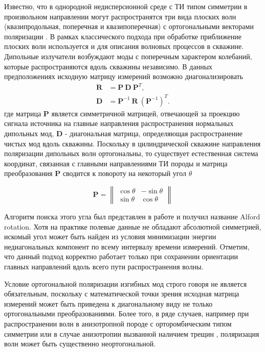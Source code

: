 \documentclass[a4paper,11pt]{article}
\begin{document}
Известно, что в однородной недисперсионной среде с ТИ типом симметрии в произвольном направлении могут распространятся три вида плоских волн (квазипродольная, поперечная и квазипоперечная) с ортогональными векторами поляризации \cite{Musgrave1970}. В рамках классического подхода при обработке приближение плоских волн используется и для описания волновых процессов в скважине. Дипольные излучатели возбуждают моды с поперечным характером колебаний, которые распространяются вдоль скважины независимо. В данных предположениях исходную матрицу измерений возможно диагонализировать \cite{Dellinger1998}
\begin{equation}
\begin{split}
	\mathbf{R} &= \mathbf{P} \ \mathbf{D} \ \mathbf{P}^T, \label{eq:alford_symmetric} \\ 
	\mathbf{D} &= \mathbf{P}^{-1} \ \mathbf{R} \ (\mathbf{P}^{-1})^{T}.
\end{split}
\end{equation}
где матрица $\mathbf{P}$ является симметричной матрицей, отвечающей за проекцию сигнала источника на главные направления распространения нормальных дипольных мод, $\mathbf{D}$ - диагональная матрица, определяющая распространение чистых мод вдоль скважины. Поскольку в цилиндрической скважине направления поляризации дипольных волн ортогональны, то существует естественная система координат, связанная с главными направлениями ТИ породы и матрица преобразования $\mathbf{P}$ сводится к повороту на некоторый угол $\theta$

\begin{equation*}
	\mathbf{P} = \left\|
	\begin{array}{cc}
	\cos \theta &-\sin \theta \\ 
	\sin \theta & \cos \theta
	\end{array} 
	\right\| 
\end{equation*}

Алгоритм поиска этого угла был представлен в работе \cite{Alford1986} и получил название Alford rotation. Хотя на практике полевые данные не обладают абсолютной симметрией, искомый угол может быть найден из условия минимизации энергии недиагональных компонент по всему интервалу времени измерений. Отметим, что данный подход корректно работает только при сохранении ориентации главных направлений вдоль всего пути распространения волны.

Условие ортогональной поляризации изгибных мод строго говоря не является обязательным, поскольку с математической точки зрения исходная матрица измерений может быть приведена к диагональному виду не только ортогональными преобразованиями. Более того, в ряде случаев, например при распространении волн в анизотропной породе с орторомбическим типом симметрии \cite{Dellinger2001} или в случае анизотропии вызванной наличием трещин \cite{Nolte1996}, поляризация волн может быть существенно неортогональной. 
\end{document}
